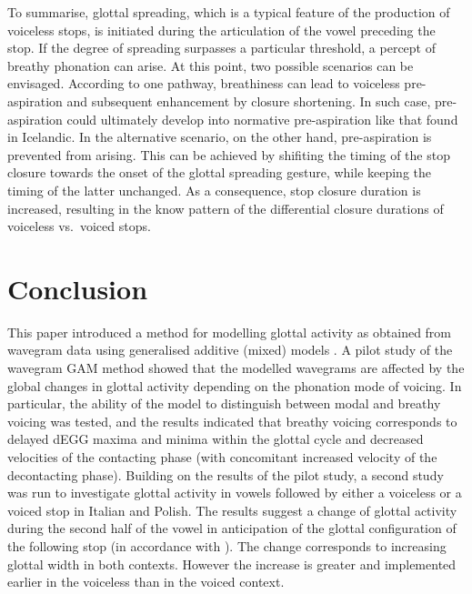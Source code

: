 \documentclass[
  11pt,
  a4paper,
]{article}
\begin{document}
To summarise, glottal spreading, which is a typical feature of the
production of voiceless stops, is initiated during the articulation of
the vowel preceding the stop. If the degree of spreading surpasses a
particular threshold, a percept of breathy phonation can arise. At this
point, two possible scenarios can be envisaged. According to one
pathway, breathiness can lead to voiceless pre-aspiration and subsequent
enhancement by closure shortening. In such case, pre-aspiration could
ultimately develop into normative pre-aspiration like that found in
Icelandic. In the alternative scenario, on the other hand,
pre-aspiration is prevented from arising. This can be achieved by
shifiting the timing of the stop closure towards the onset of the
glottal spreading gesture, while keeping the timing of the latter
unchanged. As a consequence, stop closure duration is increased,
resulting in the know pattern of the differential closure durations of
voiceless vs.~voiced stops.

\hypertarget{conclusion}{%
\section{Conclusion}\label{conclusion}}

\label{s:conclusion}

This paper introduced a method for modelling glottal activity as
obtained from wavegram data \citep{herbst2010} using generalised
additive (mixed) models \citep{hastie1986, zuur2012, wood2017}. A pilot
study of the wavegram GAM method showed that the modelled wavegrams are
affected by the global changes in glottal activity depending on the
phonation mode of voicing. In particular, the ability of the model to
distinguish between modal and breathy voicing was tested, and the
results indicated that breathy voicing corresponds to delayed dEGG
maxima and minima within the glottal cycle and decreased velocities of
the contacting phase (with concomitant increased velocity of the
decontacting phase). Building on the results of the pilot study, a
second study was run to investigate glottal activity in vowels followed
by either a voiceless or a voiced stop in Italian and Polish. The
results suggest a change of glottal activity during the second half of
the vowel in anticipation of the glottal configuration of the following
stop (in accordance with \citealt{halle1967a}). The change corresponds
to increasing glottal width in both contexts. However the increase is
greater and implemented earlier in the voiceless than in the voiced
context.
\end{document}
